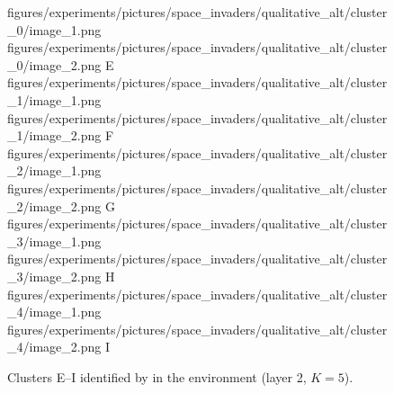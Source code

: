 \begin{figure}[H]
    \qualitativeClusterFigureSetup
    \qualitativeClusterTwo
        {figures/experiments/pictures/space_invaders/qualitative_alt/cluster_0/image_1.png}
        {figures/experiments/pictures/space_invaders/qualitative_alt/cluster_0/image_2.png}
        {E}
    \qualitativeClusterTwo
        {figures/experiments/pictures/space_invaders/qualitative_alt/cluster_1/image_1.png}
        {figures/experiments/pictures/space_invaders/qualitative_alt/cluster_1/image_2.png}
        {F}
    \qualitativeClusterTwo
        {figures/experiments/pictures/space_invaders/qualitative_alt/cluster_2/image_1.png}
        {figures/experiments/pictures/space_invaders/qualitative_alt/cluster_2/image_2.png}
        {G}
    \qualitativeClusterTwo
        {figures/experiments/pictures/space_invaders/qualitative_alt/cluster_3/image_1.png}
        {figures/experiments/pictures/space_invaders/qualitative_alt/cluster_3/image_2.png}
        {H}
    \qualitativeClusterTwo
        {figures/experiments/pictures/space_invaders/qualitative_alt/cluster_4/image_1.png}
        {figures/experiments/pictures/space_invaders/qualitative_alt/cluster_4/image_2.png}
        {I}
    \caption{Clusters E--I identified by  in the \SpaceInvadersName environment (layer 2, $K=5$).}
    \label{fig:qualitative_space_invaders_alt}
\end{figure}
